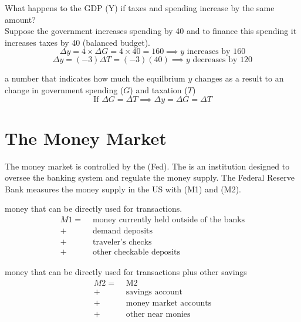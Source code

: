 \documentclass{article}
\begin{document}
\begin{example}
  What happens to the GDP (Y) if taxes and spending increase by the same amount? \\ 

  Suppose the government increases spending by 40 and to finance this spending it increases taxes by 40 (balanced budget).  
  $$\Delta y = 4 \times \Delta G = 4 \times 40 = 160 \implies y \textrm{ increases by } 160$$
  $$\Delta y = (-3) \Delta T = (-3)(40) \implies y \textrm{ decreases by } 120$$
\end{example}

\begin{definition}
  a number that indicates how much the equilbrium $y$ changes as a result to an  change in government spending ($G$) and taxation ($T$) 
  $$\textrm{If } \Delta G = \Delta T \implies \Delta y = \Delta G = \Delta T$$
\end{definition}

\section{The Money Market}

The money market is controlled by the  (Fed). The  is an institution designed to oversee the banking system and regulate the money supply. The Federal Reserve Bank measures the money supply in the US with  (M1) and  (M2). 

\begin{definition}
  money that can be directly used for transactions. 
  \begin{align*}
    M1 = &\textrm{ money currently held outside of the banks} \\ 
    + &\textrm{ demand deposits} \\ 
    + &\textrm{ traveler's checks} \\ 
    + &\textrm{ other checkable deposits}
  \end{align*}
\end{definition}

\begin{definition}
  money that can be directly used for transactions plus other savings
  \begin{align*}
    M2 = &\textrm{ M2 } \\ 
    + &\textrm{ savings account} \\
    + &\textrm{ money market accounts} \\ 
    + &\textrm{ other near monies} \\ 
  \end{align*}
\end{definition}
\end{document}
